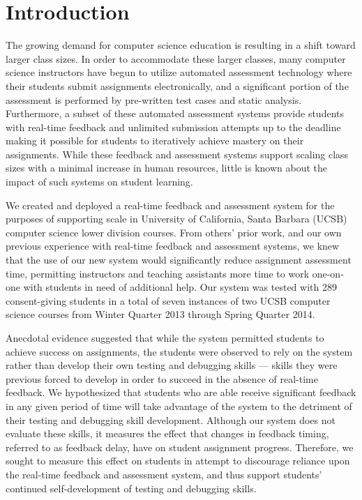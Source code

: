 \section{Introduction}
The growing demand for computer science education is resulting in a shift
toward larger class sizes. In order to accommodate these larger classes, many
computer science instructors have begun to utilize automated assessment
technology where their students submit assignments electronically, and a
significant portion of the assessment is performed by pre-written test cases
and static analysis. Furthermore, a subset of these automated assessment
systems provide students with real-time feedback and unlimited submission
attempts up to the deadline making it possible for students to iteratively
achieve mastery on their assignments. While these feedback and assessment
systems support scaling class sizes with a minimal increase in human resources,
little is known about the impact of such systems on student learning.

We created and deployed a real-time feedback and assessment system for the
purposes of supporting scale in University of California, Santa Barbara (UCSB)
computer science lower division courses. From others' prior work, and our own
previous experience with real-time feedback and assessment systems, we knew
that the use of our new system would significantly reduce assignment assessment
time, permitting instructors and teaching assistants more time to work
one-on-one with students in need of additional help. Our system was tested with
289 consent-giving students in a total of seven instances of two UCSB computer
science courses from Winter Quarter 2013 through Spring Quarter 2014.

Anecdotal evidence suggested that while the system permitted students to
achieve success on assignments, the students were observed to rely on the
system rather than develop their own testing and debugging skills --- skills
they were previous forced to develop in order to succeed in the absence of
real-time feedback. We hypothesized that students who are able receive
significant feedback in any given period of time will take advantage of the
system to the detriment of their testing and debugging skill
development. Although our system does not evaluate these skills, it measures
the effect that changes in feedback timing, referred to as feedback delay, have
on student assignment progress. Therefore, we sought to measure this effect on
students in attempt to discourage reliance upon the real-time feedback and
assessment system, and thus support students' continued self-development of
testing and debugging skills.

